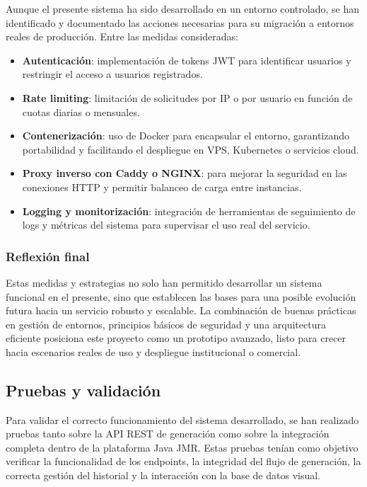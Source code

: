 Aunque el presente sistema ha sido desarrollado en un entorno controlado, se han identificado y documentado las acciones necesarias para su migración a entornos reales de producción. Entre las medidas consideradas:

\begin{itemize}
    \item \textbf{Autenticación}: implementación de tokens JWT para identificar usuarios y restringir el acceso a usuarios registrados.
    \item \textbf{Rate limiting}: limitación de solicitudes por IP o por usuario en función de cuotas diarias o mensuales.
    \item \textbf{Contenerización}: uso de Docker para encapsular el entorno, garantizando portabilidad y facilitando el despliegue en VPS, Kubernetes o servicios cloud.
    \item \textbf{Proxy inverso con Caddy o NGINX}: para mejorar la seguridad en las conexiones HTTP y permitir balanceo de carga entre instancias.
    \item \textbf{Logging y monitorización}: integración de herramientas de seguimiento de logs y métricas del sistema para supervisar el uso real del servicio.
\end{itemize}

\subsubsection{Reflexión final}
Estas medidas y estrategias no solo han permitido desarrollar un sistema funcional en el presente, sino que establecen las bases para una posible evolución futura hacia un servicio robusto y escalable. La combinación de buenas prácticas en gestión de entornos, principios básicos de seguridad y una arquitectura eficiente posiciona este proyecto como un prototipo avanzado, listo para crecer hacia escenarios reales de uso y despliegue institucional o comercial.


\subsection{Pruebas y validación}

Para validar el correcto funcionamiento del sistema desarrollado, se han realizado pruebas tanto sobre la API REST de generación como sobre la integración completa dentro de la plataforma Java JMR. Estas pruebas tenían como objetivo verificar la funcionalidad de los endpoints, la integridad del flujo de generación, la correcta gestión del historial y la interacción con la base de datos visual.

